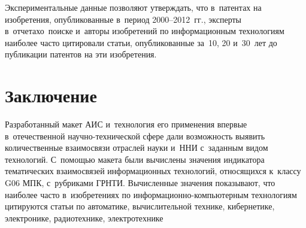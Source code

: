 \begin{multicols}{2}
  Экспериментальные данные позволяют утверж\-дать, что в~патентах на изобретения,
опубликованные в~период 2000--2012~гг., эксперты в~отчетах\linebreak о~поиске и~авторы изобретений
по информационным технологиям наиболее часто цитировали \mbox{статьи}, опубликованные
за~10, 20 и~30~лет до пуб\-ли\-ка\-ции патентов на эти изобретения.
\vspace*{-3pt}

\section{Заключение}


Разработанный макет АИС и~технология его применения впервые в~отечественной
на\-уч\-но-тех\-ни\-че\-ской сфере дали возможность выявить
количественные взаимосвязи отраслей
науки и~ННИ с~заданным видом технологий. С~помощью %
макета %
 \mbox{были} вычислены значения
индикатора %
тематиче\-ских взаимосвязей информационных %
технологий, относящихся к~классу
G06 МПК, с~руб\-ри\-ка\-ми ГРНТИ.
Вычисленные значения показывают, что наиболее %
 часто в~изобретениях по ин\-фор\-ма\-ци\-он\-но-ком\-пью\-тер\-ным
 технологиям цитируются \mbox{статьи}
по автоматике, вычислительной технике, кибернетике,
элек\-тро\-ни\-ке, радиотехнике, электротехнике\linebreak\vspace*{-12pt}

\pagebreak

\end{multicols}

\noindent
\begin{figure} %
 \vspace*{1pt}
 \begin{center}
 \mbox{%
 \epsfxsize=152.96mm %
 }
\end{center}
 \vspace*{-9pt}
\vspace*{-18pt}
\end{figure}

